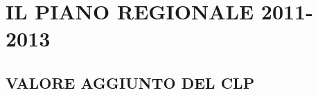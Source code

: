 \documentclass[12pt,a4paper,openright,twoside]{report}
\begin{document}
\section{IL PIANO REGIONALE 2011-2013}

\subsection{VALORE AGGIUNTO DEL CLP}



\nocite{*}


\end{document}
